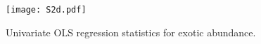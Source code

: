 \begin{landscape}
\begin{figure}[h!]
\begin{center}
\texttt{[image: S2d.pdf]} %
\caption[Univariate OLS regression statistics for exotic abundance.]{\small{Univariate OLS regression statistics for exotic abundance.}} %
\label{fig:Ch4sup2_F1} %
\end{center}
\end{figure}   
\end{landscape}
\clearpage

